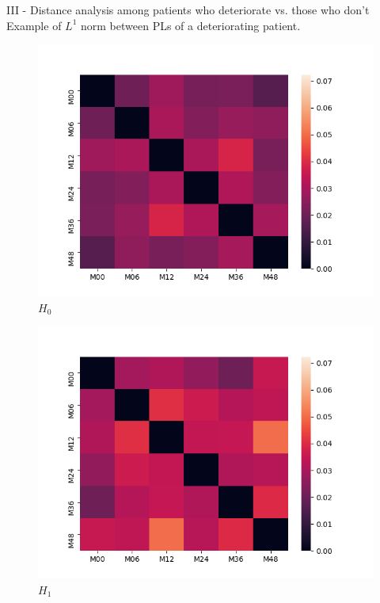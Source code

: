 \documentclass[aspectratio=169, 10pt, dvipsnames]{beamer}
\begin{document}
\begin{frame}[fragile]{III - Distance analysis among patients who deteriorate vs. those who don't}
  Example of $L^1$ norm between PLs of a deteriorating patient.\\
  \begin{figure}
    \centering \includegraphics[width=\textwidth]{figures/temporal_evolution/ADNI029S0878_h_0.png}
    \caption{$H_0$}
  \end{figure}
  \endminipage
  \hfill
  \begin{figure}
    \centering
    \includegraphics[width=\textwidth]{figures/temporal_evolution/ADNI029S0878_h_1.png}
    \caption{$H_1$}

\end{figure}
\end{frame}
\end{document}
